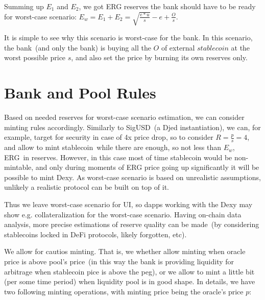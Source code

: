 \documentclass{article}   %
\newcommand{\bc}{ERG}
\newcommand{\sct}{stablecoin}
\newcommand{\dx}{Dexy}
\begin{document}
Summing up $E_1$ and $E_2$, we got \bc{} reserves the bank should have to be ready for worst-case scenario: $E_w = E_1 + E_2 = \sqrt{\frac{e * u}{s}} - e + \frac{O}{s}$.

It is simple to see why this scenario is worst-case for the bank. In this scenario, the bank~(and only the bank) is buying all the $O$ of external $\sct{}$ at the worst possible price $s$, and also set the price by burning its own reserves only.  

\section{Bank and Pool Rules}

Based on needed reserves for worst-case scenario estimation, we can consider minting rules accordingly. Similarly to SigUSD~(a Djed instantiation), we can, for example, target for security in case of 
4x price drop, so to consider $R = \frac{p}{s} = 4$, and allow to mint \sct{}~while there are enough, so not less than $E_w$, \bc{}~in reserves. However, in this case most of time \sct{} would be non-mintable, and only during moments of \bc{} price going up significantly it will be possible to mint \dx{}. As worst-case scenario is based on unrealistic assumptions, unlikely a realistic protocol can be built on top of it.  

Thus we leave worst-case scenario for UI, so dapps working with the \dx{} may show e.g. collateralization for the worst-case scenario. Having on-chain data analysis, 
more precise estimations of reserve quality can be made~(by considering \sct{}s locked in DeFi protocols, likely forgotten, etc).

We allow for cautios minting. That is, we whether allow minting when oracle price is above pool's price~(in this way the bank is providing liquidity for arbitrage when \sct{} pice is above the peg), or we allow to mint a little bit (per some time period) when liquidity pool is in good shape. In details, we have two following minting operations, with minting price being the oracle's price $p$:  
\end{document}
